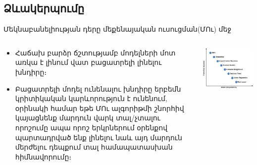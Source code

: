 \documentclass[aspectratio=169]{beamer}
\begin{document}
\subsection{Ձևակերպումը}
\begin{frame}{Մեկնաբանելիության դերը մեքենայական ուսուցման(ՄՈւ) մեջ}
\begin{columns}
  \begin{column}{0.5\textwidth}
    \begin{itemize}
      \item Հաճախ բարձր ճշտությամբ մոդելների մոտ առկա է լինում վատ բացատրելի լինելու խնդիրը։
      \pause
      \item Բացատրելի մոդել ունենալու խնդիրը երբեմն կրիտիկական կարևորություն է ունենում, օրինակի համար եթե ՄՈւ ալգորիթմի շնորհիվ կայացնենք մարդուն վարկ տալ/չտալու որոշումը ապա որոշ երկրներում օրենքով պարտադրված ենք լինելու նաև այդ մարդուն մերժելու դեպքում տալ համապատասխան հիմնավորումը։
    \end{itemize}
  \end{column}
  \pause
  \begin{column}{0.5\textwidth}
    \begin{overprint}
        \includegraphics[width=\textwidth]{"interp_over_power.jpg"}

\end{overprint}
\end{column}
\end{columns}
\end{frame}
\end{document}
